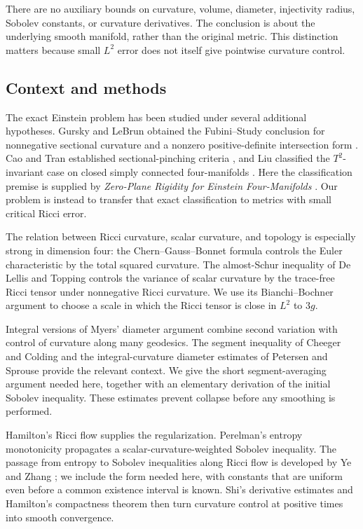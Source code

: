 \documentclass[11pt]{article}
\theoremstyle{definition}
\theoremstyle{remark}
\numberwithin{equation}{section}
\begin{document}
There are no auxiliary bounds on curvature, volume, diameter, injectivity
radius, Sobolev constants, or curvature derivatives. The conclusion is
about the underlying smooth manifold, rather than the original metric.
This distinction matters because small $L^2$ error does not itself give
pointwise curvature control.

\subsection*{Context and methods}

The exact Einstein problem has been studied under several additional
hypotheses. Gursky and LeBrun obtained the Fubini--Study conclusion for
nonnegative sectional curvature and a nonzero positive-definite
intersection form \cite{GurskyLeBrun}. Cao and Tran established
sectional-pinching criteria \cite{CaoTran}, and Liu classified the
$T^2$-invariant case on closed simply connected four-manifolds
\cite{Liu}. Here the classification premise is supplied by
\emph{Zero-Plane Rigidity for Einstein Four-Manifolds}
\cite[Corollary~1.2]{ZeroPlane}. Our problem is instead to transfer
that exact classification to metrics with small critical Ricci error.

The relation between Ricci curvature, scalar curvature, and topology is
especially strong in dimension four: the Chern--Gauss--Bonnet formula
controls the Euler characteristic by the total squared curvature.
The almost-Schur inequality of De Lellis and Topping
\cite{DeLellisTopping} controls the variance of scalar curvature by the
trace-free Ricci tensor under nonnegative Ricci curvature. We use its
Bianchi--Bochner argument to choose a scale in which the Ricci tensor is
close in $L^2$ to $3g$.

Integral versions of Myers' diameter argument combine second variation
with control of curvature along many geodesics. The segment inequality
of Cheeger and Colding \cite{CheegerColding} and the integral-curvature
diameter estimates of Petersen and Sprouse \cite{PetersenSprouse,Sprouse} provide
the relevant context. We give the short segment-averaging argument needed
here, together with an elementary derivation of the initial Sobolev
inequality. These estimates prevent collapse before any smoothing is
performed.

Hamilton's Ricci flow \cite{HamiltonRF} supplies the regularization.
Perelman's entropy monotonicity \cite{Perelman} propagates a
scalar-curvature-weighted Sobolev inequality. The passage from entropy
to Sobolev inequalities along Ricci flow is developed by Ye and Zhang
\cite{Ye,Zhang}; we include the form needed here, with constants that are
uniform even before a common existence interval is known. Shi's
derivative estimates \cite{Shi} and Hamilton's compactness theorem
\cite{HamiltonCompactness} then turn curvature control at positive times
into smooth convergence.
\end{document}
